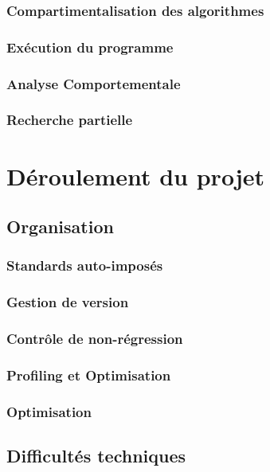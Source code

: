 \documentclass[a4paper,10pt]{report}
\begin{document}
\subsection{Compartimentalisation des algorithmes}

\subsection{Exécution du programme}

\subsection{Analyse Comportementale}

\subsection{Recherche partielle}



\chapter{Déroulement du projet}
\section{Organisation}
\subsection{Standards auto-imposés}

\subsection{Gestion de version}

\subsection{Contrôle de non-régression}

\subsection{Profiling et Optimisation}

\subsection{Optimisation}

\section{Difficultés techniques}
\end{document}
